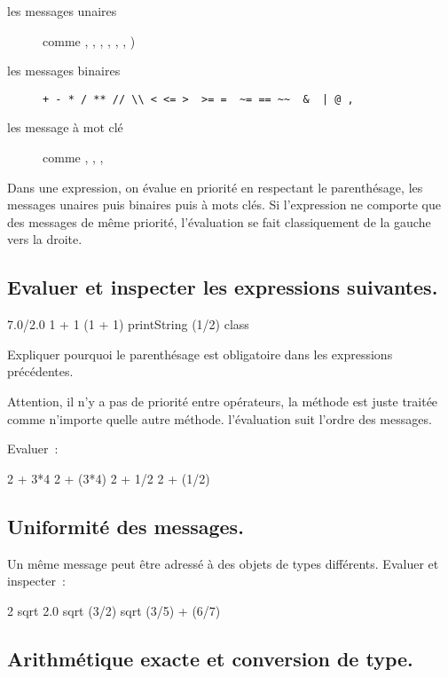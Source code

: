 \begin{description}
\item [ les messages unaires ] comme , , , , , , )
\item [ les messages binaires ] 
\verb?+ - * / ** // \\ < <= >  >= =  ~= == ~~  &  | @ ,?
\item [ les message \`a mot cl\'e ] comme , , , 
\end{description}
Dans une expression, on \'evalue en priorit\'e en respectant le parenth\'esage, les messages unaires puis binaires puis \`a mots cl\'es. Si l'expression ne comporte que des messages de m\^eme priorit\'e, l'\'evaluation se fait classiquement de la gauche vers la droite.

\subsection{Evaluer et inspecter les expressions suivantes.}

\begin{scode}
7.0/2.0
1 + 1
(1 + 1) printString
(1/2) class
\end{scode}
Expliquer pourquoi le parenth\'esage est obligatoire dans les expressions pr\'ec\'edentes.

Attention, il n'y a pas de priorit\'e entre op\'erateurs, la m\'ethode \ct{+} est juste trait\'ee comme n'importe quelle autre m\'ethode. l'\'evaluation suit l'ordre des messages. 

Evaluer~:
\begin{scode}
2 + 3*4
2 + (3*4)
2  + 1/2
2 + (1/2)
\end{scode}

\subsection{Uniformit\'e des messages.} Un m\^eme message peut \^etre adress\'e
\`a des objets de types diff\'erents. Evaluer et inspecter~:

\begin{scode}
2 sqrt
2.0 sqrt
(3/2) sqrt
(3/5) + (6/7)
\end{scode}


\subsection{Arithm\'etique exacte et conversion de type.}

